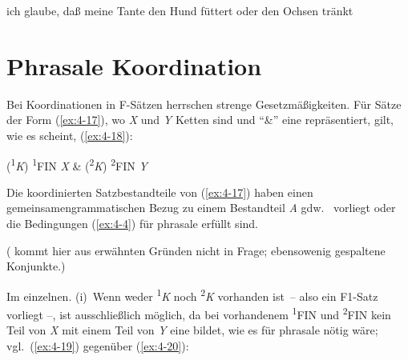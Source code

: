 \documentclass[output=paper]{langsci/langscibook}
\begin{document}

\begin{exe}
\ex%
\label{ex:4-16}
ich glaube, daß meine Tante den Hund füttert oder den Ochsen tränkt
\end{exe}
\section{Phrasale Koordination}%
\label{sec:4-2}

Bei Koordinationen in F-Sätzen herrschen strenge Gesetzmäßigkeiten. Für Sätze der Form (\ref{ex:4-17}), wo \textit{X} und \textit{Y} Ketten sind und "`\&"' eine  repräsentiert, gilt, wie es scheint, (\ref{ex:4-18}):

\begin{exe}
\ex%
\label{ex:4-17}
(\textsuperscript{1}\textit{K}) \quad \textsuperscript{1}FIN \quad \textit{X} \quad \& \quad (\textsuperscript{2}\textit{K}) \quad \textsuperscript{2}FIN \quad \textit{Y}

\ex%
\label{ex:4-18}
Die koordinierten Satzbestandteile von (\ref{ex:4-17}) haben einen gemeinsamen\linebreak grammatischen Bezug zu einem Bestandteil \textit{A} gdw.\  vorliegt oder die Bedingungen (\ref{ex:4-4}) für phrasale  erfüllt sind.
\end{exe}
( kommt hier aus erwähnten Gründen nicht in Frage; ebensowenig gespaltene Konjunkte.)

Im einzelnen. (i)~Wenn weder \textsuperscript{1}\textit{K} noch \textsuperscript{2}\textit{K} vorhanden ist~-- also ein F1-Satz vorliegt –, ist ausschließlich  möglich, da bei vorhandenem \textsuperscript{1}FIN und \textsuperscript{2}FIN kein Teil von \textit{X} mit einem Teil von \textit{Y} eine  bildet, wie es für phrasale  nötig wäre; vgl.\ (\ref{ex:4-19}) gegenüber (\ref{ex:4-20}):
\end{document}
